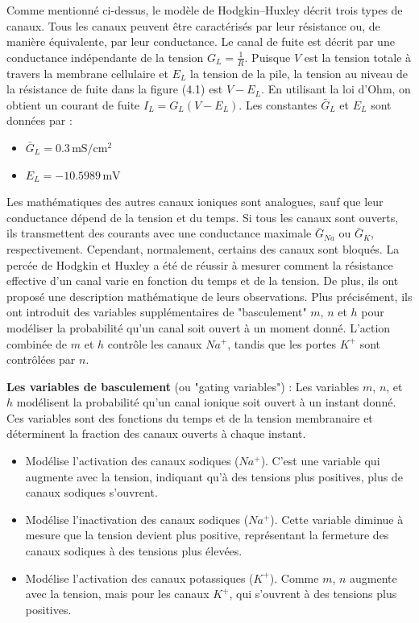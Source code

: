 Comme mentionné ci-dessus, le modèle de Hodgkin–Huxley décrit trois types de canaux. Tous les canaux peuvent être caractérisés par leur résistance ou, de manière équivalente, par leur conductance. Le canal de fuite est décrit par une conductance indépendante de la tension $G_L = \frac{1}{R}$. Puisque $V$ est la tension totale à travers la membrane cellulaire et $E_L$ la tension de la pile, la tension au niveau de la résistance de fuite dans la figure (4.1) est $V - E_L$. En utilisant la loi d'Ohm, on obtient un courant de fuite $I_L = G_L (V - E_L)$.
Les constantes $\bar{G}_L$ et $E_L$ sont données par : 
\begin{itemize}
	\item $\bar{G}_L = 0.3 \, \text{mS}/\text{cm}^2$
	\item $E_L = -10.5989 \, \text{mV}$ 
\end{itemize}

Les mathématiques des autres canaux ioniques sont analogues, sauf que leur conductance dépend de la tension et du temps. Si tous les canaux sont ouverts, ils transmettent des courants avec une conductance maximale $\bar{G}_{Na}$ ou $\bar{G}_K$, respectivement. Cependant, normalement, certains des canaux sont bloqués. 
La percée de Hodgkin et Huxley a été de réussir à mesurer comment la résistance effective d'un canal varie en fonction du temps et de la tension. De plus, ils ont proposé une description mathématique de leurs observations. Plus précisément, ils ont introduit des variables supplémentaires de "basculement" $m$, $n$ et $h$ pour modéliser la probabilité qu'un canal soit ouvert à un moment donné.
L'action combinée de $m$ et $h$ contrôle les canaux $Na^+$, tandis que les portes $K^+$ sont contrôlées par $n$. 

\textbf{Les variables de basculement} (ou "gating variables") : 
Les variables $m$, $n$, et $h$ modélisent la probabilité qu'un canal ionique soit ouvert à un instant donné. Ces variables sont des fonctions du temps et de la tension membranaire et déterminent la fraction des canaux ouverts à chaque instant.
\begin{itemize}
	\item[$m$ :] Modélise l'activation des canaux sodiques ($Na^+$). C'est une variable qui augmente avec la tension, indiquant qu'à des tensions plus positives, plus de canaux sodiques s'ouvrent.
	\item[$h$ :] Modélise l'inactivation des canaux sodiques ($Na^+$). Cette variable diminue à mesure que la tension devient plus positive, représentant la fermeture des canaux sodiques à des tensions plus élevées.
	\item[$n$ :] Modélise l'activation des canaux potassiques ($K^+$). Comme $m$, $n$ augmente avec la tension, mais pour les canaux $K^+$, qui s'ouvrent à des tensions plus positives.
\end{itemize}

